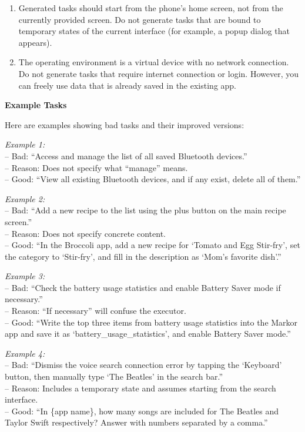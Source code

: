 \documentclass{article} %
\begin{document}
\begin{tcolorbox}[title=Prompt for Task Instruction Synthesis, colback=gray!5, colframe=gray!50, fonttitle=\bfseries\small, fontupper=\small, fontlower=\small, breakable]
\begin{enumerate}[leftmargin=1.5em]
    \item Generated tasks should start from the phone's home screen, not from the currently provided screen. Do not generate tasks that are bound to temporary states of the current interface (for example, a popup dialog that appears).

    \item The operating environment is a virtual device with no network connection. Do not generate tasks that require internet connection or login. However, you can freely use data that is already saved in the existing app.
\end{enumerate}

\textbf{Example Tasks}

Here are examples showing bad tasks and their improved versions:

\textit{Example 1:}\\
-- Bad: ``Access and manage the list of all saved Bluetooth devices.''\\
-- Reason: Does not specify what ``manage'' means.\\
-- Good: ``View all existing Bluetooth devices, and if any exist, delete all of them.''

\textit{Example 2:}\\
-- Bad: ``Add a new recipe to the list using the plus button on the main recipe screen.''\\
-- Reason: Does not specify concrete content.\\
-- Good: ``In the Broccoli app, add a new recipe for `Tomato and Egg Stir-fry', set the category to `Stir-fry', and fill in the description as `Mom's favorite dish'.''

\textit{Example 3:}\\
-- Bad: ``Check the battery usage statistics and enable Battery Saver mode if necessary.''\\
-- Reason: ``If necessary'' will confuse the executor.\\
-- Good: ``Write the top three items from battery usage statistics into the Markor app and save it as `battery\_usage\_statistics', and enable Battery Saver mode.''

\textit{Example 4:}\\
-- Bad: ``Dismiss the voice search connection error by tapping the `Keyboard' button, then manually type `The Beatles' in the search bar.''\\
-- Reason: Includes a temporary state and assumes starting from the search interface.\\
-- Good: ``In \{app name\}, how many songs are included for The Beatles and Taylor Swift respectively? Answer with numbers separated by a comma.''


\end{tcolorbox}
\end{document}
